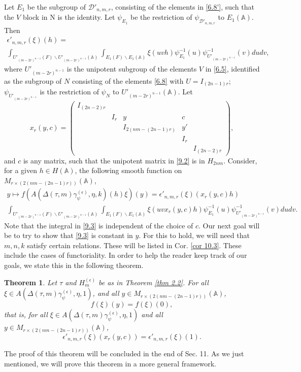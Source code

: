 \documentclass[12pts]{amsart}
\newcommand{\BA}{{\mathbb {A}}}
\newtheorem{thm}{Theorem}[section]
\begin{document}
Let $E_1$ be the subgroup of $\mathcal{D}'_{n,m,r}$, consisting of
the elements in \eqref{6.8'}, such that the $V$ block in $\mathrm{N}$ is the identity. Let
$\psi_{E_1}$ be the restriction of $\psi_{\mathcal{D}'_{n,m,r}}$ to $E_1(\BA)$. Then
\begin{multline}\label{9.1}
\epsilon'_{n,m,r}(\xi)(h)=\\
\int_{U'_{{(m-2r)}^{n-1}}(F)\backslash
	U'_{{(m-2r)}^{n-1}}(\BA)}\int_{E_1(F)\backslash E_1(\BA)}\xi(uvh)\psi^{-1}_{E_1}(u)\psi^{-1}_{U'_{{(m-2r)}^{n-1}}}(v)dudv,
\end{multline}
where $U'_{{(m-2r)}^{n-1}}$ is the unipotent subgroup of the elements $V$ in \eqref{6.5}, identified as the subgroup of $N$ consisting of the elements \eqref{6.8} with $U=I_{(2n-1)r}$;
$\psi_{U'_{(m-2r)^{n-1}}}$ is the restriction of $\psi_N$ to
$U'_{(m-2r)^{n-1}}(\BA)$. Let
\begin{equation}\label{9.2}
x_r(y,c)=\begin{pmatrix}I_{(2n-2)r}\\&I_r&y&c\\&&I_{2(nm-(2n-1)r)}&y'\\&&&I_r\\
&&&&I_{(2n-2)r}\end{pmatrix},
\end{equation}
and $c$ is any matrix, such that the unipotent matrix
in \eqref{9.2} is in $H_{2nm}$.
Consider, for a given $h\in H(\BA)$, the following
smooth function on
$M_{r\times (2(nm-(2n-1)r))}(\BA)$,
\begin{multline}\label{9.3}
y\mapsto f(A(\Delta(\tau,m)\gamma_\psi^{(\epsilon)},\eta, k)(h)\xi)(y)=\epsilon'_{n,m,r}(\xi)(x_r(y,c)h)\\
\int_{U'_{{(m-2r)}^{n-1}}(F)\backslash
	U'_{{(m-2r)}^{n-1}}(\BA)}\int_{E_1(F)\backslash E_1(\BA)}\xi(uvx_r(y,c)h)\psi^{-1}_{E_1}(u)\psi^{-1}_{U'_{{(m-2r)}^{n-1}}}(v)dudv.
\end{multline}
Note that the integral in
\eqref{9.3} is independent of the choice of $c$. Our next goal will be to try to show that \eqref{9.3} is constant in $y$. For this to hold, we will need that $m, n, k$ satisfy certain relations. These will be listed in Cor. \ref{cor 10.3}. These include the cases of functoriality. In order to help the reader keep track of our goals, we state this in the following theorem.
\begin{thm}\label{thm 9.0}
Let $\tau$ and $H_m^{(\epsilon)}$ be as in Theorem \ref{thm 2.2}. For all $\xi\in A(\Delta(\tau,m)\gamma_\psi^{(\epsilon)},\eta, 1)$, and all $y\in M_{r\times (2(nm-(2n-1)r))}(\BA)$,
$$
f(\xi)(y)=f(\xi)(0),
$$
that is, for all $\xi\in A(\Delta(\tau,m)\gamma_\psi^{(\epsilon)},\eta, 1)$ and all $y\in M_{r\times (2(nm-(2n-1)r))}(\BA)$,
$$
\epsilon'_{n,m,r}(\xi)(x_r(y,c))=\epsilon'_{n,m,r}(\xi)(1).
$$

\end{thm}
The proof of this theorem will be concluded in the end of Sec. 11. As we just mentioned, we will prove this theorem in a more general framework.
\end{document}

